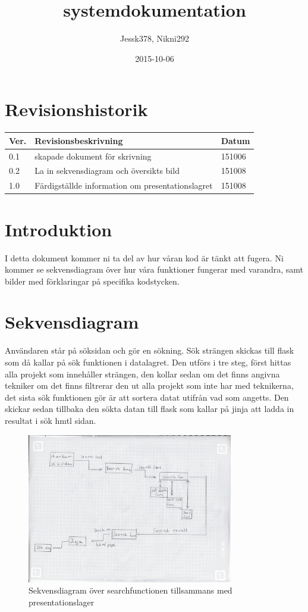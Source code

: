 \documentclass{TDP003mall}
\author{Jessk378, Nikni292}
\title{systemdokumentation}
\date{2015-10-06}
\begin{document}
\projectpage
\section{Revisionshistorik}
\begin{table}[!h]
\begin{tabularx}{\linewidth}{|l|X|l|}\hline
Ver. & Revisionsbeskrivning & Datum \\\hline
0.1 & skapade dokument för skrivning & 151006\\\hline
0.2 & La in sekvensdiagram och översikts bild & 151008\\\hline
1.0 & Färdigställde information om presentationslagret & 151008\\\hline
\end{tabularx}
\end{table}
\pagebreak
\tableofcontents
\newpage

\section{Introduktion}
I detta dokument kommer ni ta del av hur våran kod är tänkt att fugera. Ni kommer se sekvensdiagram över hur våra funktioner fungerar med varandra, samt bilder med förklaringar på specifika kodstycken.

\section{Sekvensdiagram}
Användaren står på söksidan och gör en sökning. Sök strängen skickas till flask som då kallar på sök funktionen i datalagret. Den utförs i tre steg, först hittas alla projekt som innehåller strängen, den kollar sedan om det finns angivna tekniker om det finns filtrerar den ut alla projekt som inte har med teknikerna, det sista sök funktionen gör är att sortera datat utifrån vad som angetts. Den skickar sedan tillbaka den sökta datan till flask som kallar på jinja att ladda in resultat i sök hmtl sidan.
\begin{figure}[ht!]
\centering
\includegraphics[width=90mm]{sekv.jpg}
\caption{Sekvensdiagram över searchfunctionen tillsammans med presentationslager}\label{sekv_dia}
\end{figure}
\pagebreak
\end{document}
